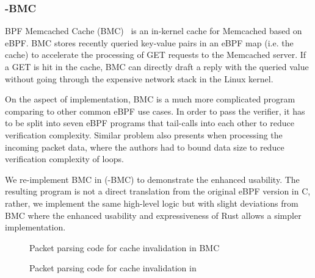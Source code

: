 \subsubsection{\projname{}-BMC}
BPF Memcached Cache (BMC)~\cite{BMC} is an in-kernel cache for Memcached based
    on eBPF.
BMC stores recently queried key-value pairs in an eBPF map (i.e. the cache) to
    accelerate the processing of GET requests to the Memcached server.
If a GET is hit in the cache, BMC can directly draft a reply with the queried
    value without going through the expensive network stack in the Linux kernel.

On the aspect of implementation, BMC is a much more complicated program
    comparing to other common eBPF use cases.
In order to pass the verifier, it has to be split into seven
    eBPF programs that tail-calls into each other to reduce verification
    complexity.
Similar problem also presents when processing the incoming packet data, where
    the authors had to bound data size to reduce verification complexity of
    loops.

We re-implement BMC in \projname{} (\projname{}-BMC) to demonstrate the
    enhanced usability.
The resulting program is not a direct translation from the original eBPF
    version in C, rather, we implement the same high-level logic but with
    slight deviations from BMC where the enhanced usability and expressiveness
    of Rust allows a simpler implementation.


\begin{figure}
    
    \caption{Packet parsing code for cache invalidation in BMC}
    \label{fig:bmc-code}
\end{figure}
\begin{figure}
    
    \caption{Packet parsing code for cache invalidation in \projname{}
    }
    \label{fig:rust-code}
\end{figure}

